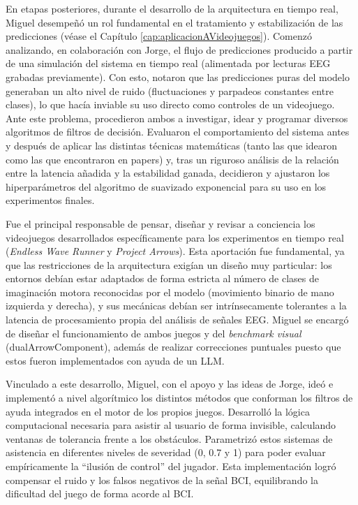 En etapas posteriores, durante el desarrollo de la arquitectura en tiempo real, Miguel desempeñó un rol fundamental en el tratamiento y estabilización de las predicciones (véase el Capítulo \ref{cap:aplicacionAVideojuegos}). Comenzó analizando, en colaboración con Jorge, el flujo de predicciones producido a partir de una simulación del sistema en tiempo real (alimentada por lecturas EEG grabadas previamente). Con esto, notaron que las predicciones puras del modelo generaban un alto nivel de ruido (fluctuaciones y parpadeos constantes entre clases), lo que hacía inviable su uso directo como controles de un videojuego. Ante este problema, procedieron ambos a investigar, idear y programar diversos algoritmos de filtros de decisión. Evaluaron el comportamiento del sistema antes y después de aplicar las distintas técnicas matemáticas (tanto las que idearon como las que encontraron en papers) y, tras un riguroso análisis de la relación entre la latencia añadida y la estabilidad ganada, decidieron y ajustaron los hiperparámetros del algoritmo de suavizado exponencial para su uso en los experimentos finales.

Fue el principal responsable de pensar, diseñar y revisar a conciencia los videojuegos desarrollados específicamente para los experimentos en tiempo real (\textit{Endless Wave Runner} y \textit{Project Arrows}). Esta aportación fue fundamental, ya que las restricciones de la arquitectura exigían un diseño muy particular: los entornos debían estar adaptados de forma estricta al número de clases de imaginación motora reconocidas por el modelo (movimiento binario de mano izquierda y derecha), y sus mecánicas debían ser intrínsecamente tolerantes a la latencia de procesamiento propia del análisis de señales EEG. Miguel se encargó de diseñar el funcionamiento de ambos juegos y del \textit{benchmark visual} (dualArrowComponent), además de realizar correcciones puntuales puesto que estos fueron implementados con ayuda de un LLM.

Vinculado a este desarrollo, Miguel, con el apoyo y las ideas de Jorge, ideó e implementó a nivel algorítmico los distintos métodos que conforman los filtros de ayuda integrados en el motor de los propios juegos. Desarrolló la lógica computacional necesaria para asistir al usuario de forma invisible, calculando ventanas de tolerancia frente a los obstáculos. Parametrizó estos sistemas de asistencia en diferentes niveles de severidad (0, 0.7 y 1) para poder evaluar empíricamente la ``ilusión de control'' del jugador. Esta implementación logró compensar el ruido y los falsos negativos de la señal BCI, equilibrando la dificultad del juego de forma acorde al BCI.

